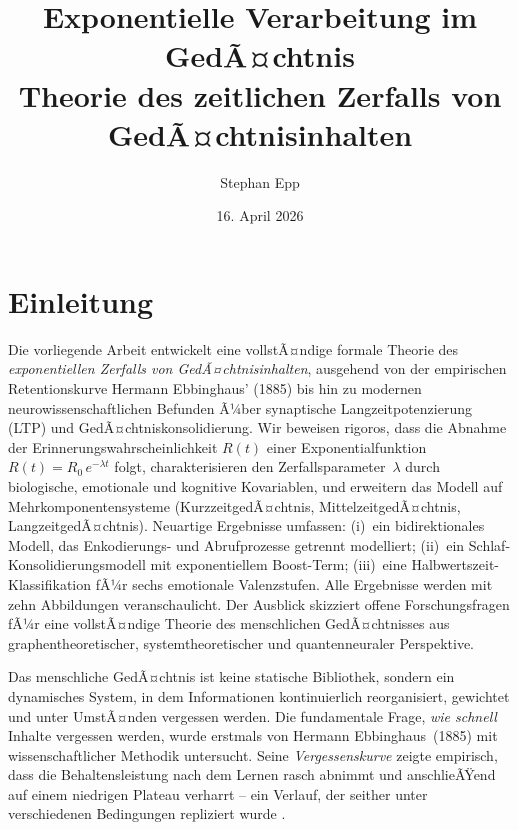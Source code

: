 ﻿\documentclass[12pt,a4paper,twoside]{article}
\title{
	{\Large\bfseries Exponentielle Verarbeitung im GedÃ¤chtnis}\\[-0.4em]
	{\large Theorie des zeitlichen Zerfalls von GedÃ¤chtnisinhalten}
}
\author{Stephan Epp}
\date{16. April 2026}
\theoremstyle{theormstyle}
\theoremstyle{proofstyle}
\begin{document}
	
	\maketitle	
	\tableofcontents
	\newpage
	
	\section{Einleitung}
	\label{sec:einleitung}
	Die vorliegende Arbeit entwickelt eine vollstÃ¤ndige formale Theorie des
	\emph{exponentiellen Zerfalls von GedÃ¤chtnisinhalten}, ausgehend von der
	empirischen Retentionskurve Hermann Ebbinghaus' (1885) bis hin zu modernen
	neurowissenschaftlichen Befunden Ã¼ber synaptische Langzeitpotenzierung (LTP)
	und GedÃ¤chtniskonsolidierung. Wir beweisen rigoros, dass die Abnahme der
	Erinnerungswahrscheinlichkeit $R(t)$ einer Exponentialfunktion
	$R(t) = R_0\,e^{-\lambda t}$ folgt, charakterisieren den
	Zerfallsparameter~$\lambda$ durch biologische, emotionale und kognitive
	Kovariablen, und erweitern das Modell auf Mehrkomponentensysteme
	(KurzzeitgedÃ¤chtnis, MittelzeitgedÃ¤chtnis, LangzeitgedÃ¤chtnis). Neuartige
	Ergebnisse umfassen: (i)~ein bidirektionales Modell, das Enkodierungs- und
	Abrufprozesse getrennt modelliert; (ii)~ein Schlaf-Konsolidierungsmodell mit
	exponentiellem Boost-Term; (iii)~eine Halbwertszeit-Klassifikation fÃ¼r sechs
	emotionale Valenzstufen. Alle Ergebnisse werden mit zehn Abbildungen
	veranschaulicht. Der Ausblick skizziert offene Forschungsfragen fÃ¼r eine
	vollstÃ¤ndige Theorie des menschlichen GedÃ¤chtnisses aus graphentheoretischer,
	systemtheoretischer und quantenneuraler Perspektive.
	
	Das menschliche GedÃ¤chtnis ist keine statische Bibliothek, sondern ein dynamisches
	System, in dem Informationen kontinuierlich reorganisiert, gewichtet und
	unter UmstÃ¤nden vergessen werden. Die fundamentale Frage, \emph{wie schnell}
	Inhalte vergessen werden, wurde erstmals von Hermann Ebbinghaus~(1885) mit
	wissenschaftlicher Methodik untersucht. Seine \emph{Vergessenskurve} zeigte
	empirisch, dass die Behaltensleistung nach dem Lernen rasch abnimmt und
	anschlieÃŸend auf einem niedrigen Plateau verharrt -- ein Verlauf, der seither
	unter verschiedenen Bedingungen repliziert wurde
	\citep{murre2015replication,wixted2004psychology}.
	
\end{document}
